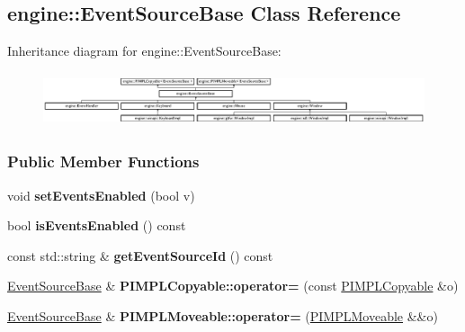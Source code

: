 \hypertarget{a00036}{}\subsection{engine\+:\+:Event\+Source\+Base Class Reference}
\label{a00036}
Inheritance diagram for engine\+:\+:Event\+Source\+Base\+:\begin{figure}[H]
\begin{center}
\leavevmode
\includegraphics[height=1.588652cm]{a00036}
\end{center}
\end{figure}
\subsubsection*{Public Member Functions}
\begin{DoxyCompactItemize}
\item 
void {\bfseries set\+Events\+Enabled} (bool v)\hypertarget{a00036_ae529242181c16462bef9bd6b8fb56b93}{}\label{a00036_ae529242181c16462bef9bd6b8fb56b93}

\item 
bool {\bfseries is\+Events\+Enabled} () const \hypertarget{a00036_a659325f18d666f132f380e4319499572}{}\label{a00036_a659325f18d666f132f380e4319499572}

\item 
const std\+::string \& {\bfseries get\+Event\+Source\+Id} () const \hypertarget{a00036_ad41deeb2b9de38797b10777e5d1ecf13}{}\label{a00036_ad41deeb2b9de38797b10777e5d1ecf13}

\item 
\hyperlink{a00036}{Event\+Source\+Base} \& {\bfseries P\+I\+M\+P\+L\+Copyable\+::operator=} (const \hyperlink{a00060}{P\+I\+M\+P\+L\+Copyable} \&o)\hypertarget{a00060_a26fdb9b3d449d04dc653c7ae942f452b}{}\label{a00060_a26fdb9b3d449d04dc653c7ae942f452b}

\item 
\hyperlink{a00036}{Event\+Source\+Base} \& {\bfseries P\+I\+M\+P\+L\+Moveable\+::operator=} (\hyperlink{a00061}{P\+I\+M\+P\+L\+Moveable} \&\&o)\hypertarget{a00061_ac67025e8a25edffe99fa9bf67ed8ca19}{}\label{a00061_ac67025e8a25edffe99fa9bf67ed8ca19}

\end{DoxyCompactItemize}
